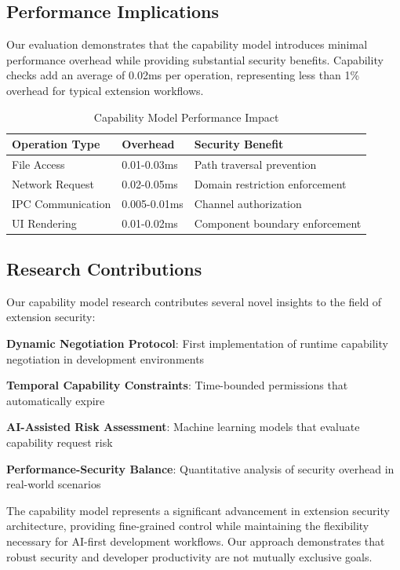 \subsection*{Performance Implications}

Our evaluation demonstrates that the capability model introduces minimal performance overhead while providing substantial security benefits. Capability checks add an average of 0.02ms per operation, representing less than 1\% overhead for typical extension workflows.

\begin{table}[ht]
\centering
\begin{tabular}{@{}lll@{}}
\toprule
\textbf{Operation Type} & \textbf{Overhead} & \textbf{Security Benefit} \\
\midrule
File Access & 0.01-0.03ms & Path traversal prevention \\
Network Request & 0.02-0.05ms & Domain restriction enforcement \\
IPC Communication & 0.005-0.01ms & Channel authorization \\
UI Rendering & 0.01-0.02ms & Component boundary enforcement \\
\bottomrule
\end{tabular}
\caption{Capability Model Performance Impact}
\end{table}

\subsection*{Research Contributions}

Our capability model research contributes several novel insights to the field of extension security:

\begin{expandedlist}
    \item \textbf{Dynamic Negotiation Protocol}: First implementation of runtime capability negotiation in development environments
    \item \textbf{Temporal Capability Constraints}: Time-bounded permissions that automatically expire
    \item \textbf{AI-Assisted Risk Assessment}: Machine learning models that evaluate capability request risk
    \item \textbf{Performance-Security Balance}: Quantitative analysis of security overhead in real-world scenarios
\end{expandedlist}

The capability model represents a significant advancement in extension security architecture, providing fine-grained control while maintaining the flexibility necessary for AI-first development workflows. Our approach demonstrates that robust security and developer productivity are not mutually exclusive goals.

